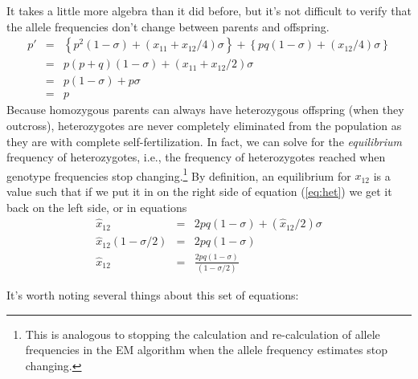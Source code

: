 \documentclass[12pt]{article}
\begin{document}
It takes a little more algebra than it did before, but it's not
difficult to verify that the allele frequencies don't change between
parents and offspring.
\begin{eqnarray}
p' &=& \left\{p^2(1-\sigma) + (x_{11} + x_{12}/4)\sigma\right\}
       + \left\{pq(1-\sigma) + (x_{12}/4)\sigma\right\} \\
   &=& p(p+q)(1-\sigma) + (x_{11} + x_{12}/2)\sigma \\
   &=& p(1-\sigma) + p\sigma \\
   &=& p
\end{eqnarray}
Because homozygous parents can always have heterozygous offspring
(when they outcross), heterozygotes are never completely eliminated
from the population as they are with complete self-fertilization. In
fact, we can solve for the {\it equilibrium} frequency of
heterozygotes, i.e., the frequency of heterozygotes reached when
genotype frequencies stop changing.\footnote{This is analogous to
  stopping the calculation and re-calculation of allele frequencies in
  the EM algorithm when the allele frequency estimates stop changing.}
By definition, an equilibrium for $x_{12}$ is a value such that if we
put it in on the right side of equation (\ref{eq:het}) we get it back
on the left side, or in equations
\begin{eqnarray}
\hat x_{12} &=& 2pq(1-\sigma) + (\hat x_{12}/2)\sigma \\
\hat x_{12}(1 - \sigma/2) &=& 2pq(1-\sigma) \\
\hat x_{12} &=& \frac{2pq(1-\sigma)}{(1-\sigma/2)}
\end{eqnarray}

\noindent It's worth noting several things about this set of
equations:
\end{document}
